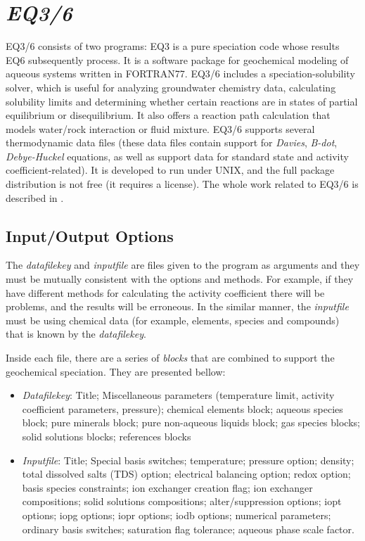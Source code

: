 
\section{\emph{EQ3/6}}
EQ3/6 consists of two programs: EQ3 is a pure speciation code whose results EQ6 subsequently process. It is a software package for geochemical modeling of aqueous systems written in FORTRAN77. 
EQ3/6 includes a speciation-solubility solver, which is useful for analyzing groundwater chemistry data, calculating solubility limits and determining whether certain reactions are in states of partial equilibrium or disequilibrium. It also offers a reaction path calculation that models water/rock interaction or fluid mixture. 
EQ3/6 supports several thermodynamic data files (these data files contain support for \emph{Davies}, \emph{B-dot}, \emph{Debye-Huckel} equations, as well as support data for standard state and activity coefficient-related). 
It is developed to run under UNIX, and the full package distribution is not free (it requires a license). The whole work related to EQ3/6 is described in \cite{Wolery:1979} \cite{Wolery:1990} \cite{Wolery:1992}.

\subsection{Input/Output Options}
The \emph{datafilekey} and \emph{inputfile} are files given to the program as arguments and they must be mutually consistent with the options and methods. For example, if they have different methods for calculating the activity coefficient there will be problems, and the results will be erroneous. In the similar manner, the \emph{inputfile} must be using chemical data (for example, elements, species and compounds) that is known by the \emph{datafilekey}.

Inside each file, there are a series of \emph{blocks} that are combined to support the geochemical speciation. They are presented bellow:
\begin{itemize}
\item \emph{Datafilekey}: Title; Miscellaneous parameters (temperature limit, activity coefficient parameters, pressure); chemical elements block; aqueous species block; pure minerals block; pure non-aqueous liquids block; gas species blocks; solid solutions blocks; references blocks
\item \emph{Inputfile}: Title; Special basis switches; temperature; pressure option; density; total dissolved salts (TDS) option; electrical balancing option; redox option; basis species constraints; ion exchanger creation flag; ion exchanger compositions; solid solutions compositions; alter/suppression options; iopt options; iopg options; iopr options; iodb options; numerical parameters; ordinary basis switches; saturation flag tolerance; aqueous phase scale factor.
\end{itemize}

